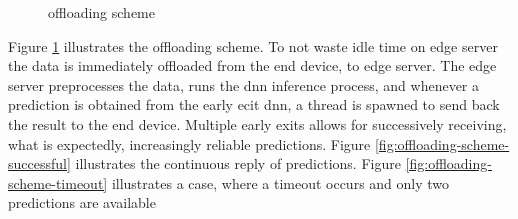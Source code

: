 \begin{figure}
	\captionsetup[subfigure]{justification=centering}
	\centering
\end{figure}
\begin{figure}
		\captionsetup[subfigure]{justification=centering}
	\centering
	\caption[Offloading scheme]{offloading scheme}
	\label{fig:offloading-scheme}
\end{figure} 

Figure \ref{fig:offloading-scheme} illustrates the offloading scheme. To not waste idle time on edge server the data is immediately offloaded from the end device, to edge server. The edge server preprocesses the data, runs the \gls{dnn} inference process, and whenever a prediction is obtained from the early ecit \gls{dnn}, a thread is spawned to send back the result to the end device. Multiple early exits allows for successively receiving, what is expectedly, increasingly reliable predictions. Figure \ref{fig:offloading-scheme-successful} illustrates the continuous reply of predictions. Figure \ref{fig:offloading-scheme-timeout} illustrates a case, where a timeout occurs and only two predictions are available 

